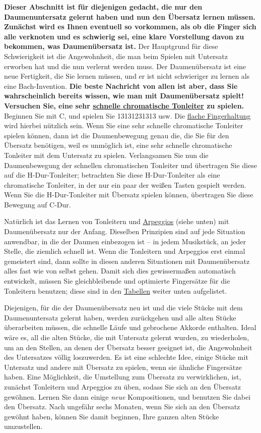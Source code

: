 \textbf{Dieser Abschnitt ist für diejenigen gedacht, die nur den Daumenuntersatz gelernt haben und nun den Übersatz lernen müssen.
Zunächst wird es Ihnen eventuell so vorkommen, als ob die Finger sich alle verknoten und es schwierig sei, eine klare Vorstellung davon zu bekommen, was Daumenübersatz ist.}
Der Hauptgrund für diese Schwierigkeit ist die Angewohnheit, die man beim Spielen mit Untersatz erworben hat und die nun verlernt werden muss.
Der Daumenübersatz ist eine neue Fertigkeit, die Sie lernen müssen, und er ist nicht schwieriger zu lernen als eine Bach-Invention.
\textbf{Die beste Nachricht von allen ist aber, dass Sie wahrscheinlich bereits wissen, wie man mit Daumenübersatz spielt!
Versuchen Sie, eine sehr \hyperref[c1iii5h]{schnelle chromatische Tonleiter} zu spielen.}
Beginnen Sie mit C, und spielen Sie 13131231313 usw.
Die \hyperref[c1iii4b]{flache Fingerhaltung} wird hierbei nützlich sein.
Wenn Sie eine sehr schnelle chromatische Tonleiter spielen können, dann ist die Daumenbewegung genau die, die Sie für den Übersatz benötigen, weil es unmöglich ist, eine sehr schnelle chromatische Tonleiter mit dem Untersatz zu spielen.
Verlangsamen Sie nun die Daumenbewegung der schnellen chromatischen Tonleiter und übertragen Sie diese auf die H-Dur-Tonleiter; betrachten Sie diese H-Dur-Tonleiter als eine chromatische Tonleiter, in der nur ein paar der weißen Tasten gespielt werden.
Wenn Sie die H-Dur-Tonleiter mit Übersatz spielen können, übertragen Sie diese Bewegung auf C-Dur.

Natürlich ist das Lernen von Tonleitern und \hyperref[Arpeggios]{Arpeggios} (siehe unten) mit Daumenübersatz nur der Anfang.
Dieselben Prinzipien sind auf jede Situation anwendbar, in die der Daumen einbezogen ist -- in jedem Musikstück, an jeder Stelle, die ziemlich schnell ist.
Wenn die Tonleitern und Arpeggios erst einmal gemeistert sind, dann sollte in diesen anderen Situationen mit Daumenübersatz alles fast wie von selbst gehen.
Damit sich dies gewissermaßen automatisch entwickelt, müssen Sie gleichbleibende und optimierte Fingersätze für die Tonleitern benutzen; diese sind in den \hyperref[table]{Tabellen} weiter unten aufgelistet.

Diejenigen, für die der Daumenübersatz neu ist und die viele Stücke mit dem Daumenuntersatz gelernt haben, werden zurückgehen und alle alten Stücke überarbeiten müssen, die schnelle Läufe und gebrochene Akkorde enthalten.
Ideal wäre es, all die alten Stücke, die mit Untersatz gelernt wurden, zu wiederholen, um an den Stellen, an denen der Übersatz besser geeignet ist, die Angewohnheit des Untersatzes völlig loszuwerden.
Es ist eine schlechte Idee, einige Stücke mit Untersatz und andere mit Übersatz zu spielen, wenn sie ähnliche Fingersätze haben.
Eine Möglichkeit, die Umstellung zum Übersatz zu verwirklichen, ist, zunächst Tonleitern und Arpeggios zu üben, sodass Sie sich an den Übersatz gewöhnen.
Lernen Sie dann einige \textit{neue} Kompositionen, und benutzen Sie dabei den Übersatz.
Nach ungefähr sechs Monaten, wenn Sie sich an den Übersatz gewöhnt haben, können Sie damit beginnen, Ihre ganzen alten Stücke umzustellen.


